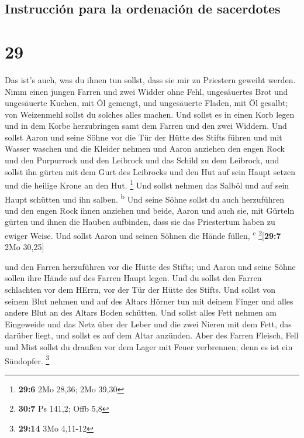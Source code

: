 \hypertarget{instrucciuxf3n-para-la-ordenaciuxf3n-de-sacerdotes}{%
\subsection{Instrucción para la ordenación de
sacerdotes}\label{instrucciuxf3n-para-la-ordenaciuxf3n-de-sacerdotes}}

\hypertarget{section-28}{%
\section{29}\label{section-28}}

 Das ist's auch, was du ihnen tun sollst, dass sie mir zu
Priestern geweiht werden. Nimm einen jungen Farren und zwei Widder ohne
Fehl,  ungesäuertes Brot und ungesäuerte Kuchen, mit Öl
gemengt, und ungesäuerte Fladen, mit Öl gesalbt; von Weizenmehl sollst
du solches alles machen.  Und sollst es in einen Korb
legen und in dem Korbe herzubringen samt dem Farren und den zwei
Widdern.  Und sollst Aaron und seine Söhne vor die Tür der
Hütte des Stifts führen und mit Wasser waschen  und die
Kleider nehmen und Aaron anziehen den engen Rock und den Purpurrock und
den Leibrock und das Schild zu dem Leibrock, und sollst ihn gürten mit
dem Gurt des Leibrocks  und den Hut auf sein Haupt setzen
und die heilige Krone an den Hut. \footnote{\textbf{29:6} 2Mo 28,36; 2Mo
  39,30}  Und sollst nehmen das Salböl und auf sein Haupt
schütten und ihn salben. \textsuperscript{b}  Und seine
Söhne sollst du auch herzuführen und den engen Rock ihnen anziehen
 und beide, Aaron und auch sie, mit Gürteln gürten und
ihnen die Hauben aufbinden, dass sie das Priestertum haben zu ewiger
Weise. Und sollst Aaron und seinen Söhnen die Hände füllen,
\textsuperscript{c} \footnote{\textbf{30:7} Ps 141,2; Offb 5,8}{[}\textbf{29:7}
2Mo 30,25{]}

 und den Farren herzuführen vor die Hütte des Stifts; und
Aaron und seine Söhne sollen ihre Hände auf des Farren Haupt legen.
 Und du sollst den Farren schlachten vor dem HErrn, vor
der Tür der Hütte des Stifts.  Und sollst von seinem Blut
nehmen und auf des Altars Hörner tun mit deinem Finger und alles andere
Blut an des Altars Boden schütten.  Und sollst alles Fett
nehmen am Eingeweide und das Netz über der Leber und die zwei Nieren mit
dem Fett, das darüber liegt, und sollst es auf dem Altar anzünden.
 Aber des Farren Fleisch, Fell und Mist sollst du draußen
vor dem Lager mit Feuer verbrennen; denn es ist ein Sündopfer.
\footnote{\textbf{29:14} 3Mo 4,11-12}


